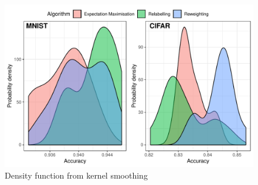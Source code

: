 \documentclass[12pt]{article} %
\begin{document}
\begin{figure}    
	\includegraphics[scale=0.9]{histo}
	\caption{Density function from kernel smoothing}
	\label{fig:Density function from kernel smoothing}
\end{figure}
\end{document}

